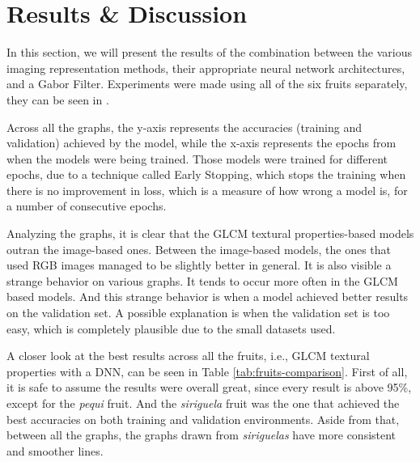 \documentclass[../main.tex]{subfile}
\begin{document}
\section{Results \& Discussion} \label{sec:results-&-discussion}
    
    In this section, we will present the results of the combination between the various imaging representation methods, their appropriate neural network architectures, and a Gabor Filter. Experiments were made using all of the six fruits separately, they can be seen in .
    
    
    
    
    
    
    
    
    Across all the graphs, the y-axis represents the accuracies (training and validation) achieved by the model, while the x-axis represents the epochs from when the models were being trained. Those models were trained for different epochs, due to a technique called Early Stopping, which stops the training when there is no improvement in loss, which is a measure of how wrong a model is, for a number of consecutive epochs.
    
    Analyzing the graphs, it is clear that the GLCM textural properties-based models outran the image-based ones. Between the image-based models, the ones that used RGB images managed to be slightly better in general. It is also visible a strange behavior on various graphs. It tends to occur more often in the GLCM based models. And this strange behavior is when a model achieved better results on the validation set. A possible explanation is when the validation set is too easy, which is completely plausible due to the small datasets used.
    
    
    
    A closer look at the best results across all the fruits, i.e., GLCM textural properties with a DNN, can be seen in Table \ref{tab:fruits-comparison}. First of all, it is safe to assume the results were overall great, since every result is above 95\%, except for the \textit{pequi} fruit. And the \textit{siriguela} fruit was the one that achieved the best accuracies on both training and validation environments. Aside from that, between all the graphs, the graphs drawn from \textit{siriguelas} have more consistent and smoother lines.
\end{document}
